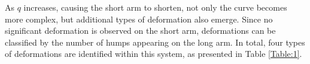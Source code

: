 \documentclass[12pt,MSc,twoside]{muthesis_2020}
\begin{document}
As $q$ increases, causing the short arm to shorten, not only the curve becomes more complex, but additional types of deformation also emerge. Since no significant deformation is observed on the short arm, deformations can be classified by the number of humps appearing on the long arm. In total, four types of deformations are identified within this system, as presented in Table \ref{Table:1}.
\begin{table}[!h]
    \setlength{\belowcaptionskip}{0.8cm}
    \caption{The four types of deformations are categorised by the number of humps appearing on the long arm of the particle.} 
    \label{Table:1}
    \renewcommand\arraystretch{1.5}
\end{table}
\end{document}

